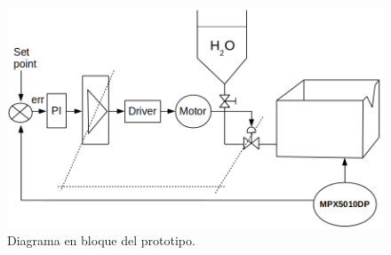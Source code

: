 \begin{figure}[h]
	\centering
	\includegraphics[scale=.60]{./Figures/Diagrama-prototipoII.png}
	\caption{Diagrama en bloque del prototipo.}
	\label{fig:Diagrama en bloque del prototipo}
	\end{figure}	
	

